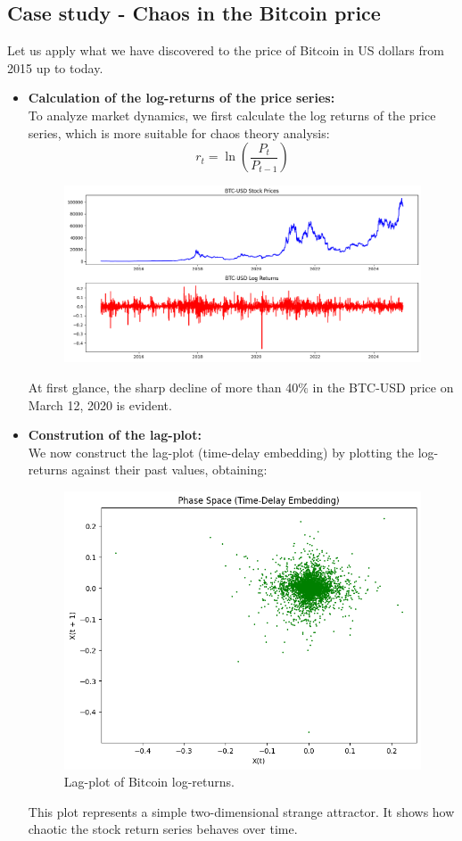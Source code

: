 \subsection{Case study - Chaos in the Bitcoin price} \label{sec:Chaos_BTC}
Let us apply what we have discovered to the price of Bitcoin in US dollars from 2015 up to today.
\begin{itemize}
    \item \textbf{Calculation of the log-returns of the price series:}\\
        To analyze market dynamics, we first calculate the log returns of the price series, which is more suitable for chaos theory analysis:
    \begin{equation*}
        r_t = \ln\!\left(\frac{P_t}{P_{t-1}}\right)
    \end{equation*}
    \begin{figure}[H]
        \centering
        \includegraphics[width=1.00\linewidth]{img/bitcoin_prices.png}
    \end{figure}
    At first glance, the sharp decline of more than 40$\%$ in the BTC-USD price on March 12, 2020 is evident.
    
    \item \textbf{Constrution of the lag-plot:}\\
        We now construct the lag-plot (time-delay embedding) by plotting the log-returns against their past values, obtaining:
    \begin{figure}[H]
        \centering
        \includegraphics[width=0.75\linewidth]{img/lag_plot_bitcoin.png}
        \caption{Lag-plot of Bitcoin log-returns.}
    \end{figure}
    This plot represents a simple two-dimensional strange attractor. It shows how chaotic the stock return series behaves over time.
    

\end{itemize}
